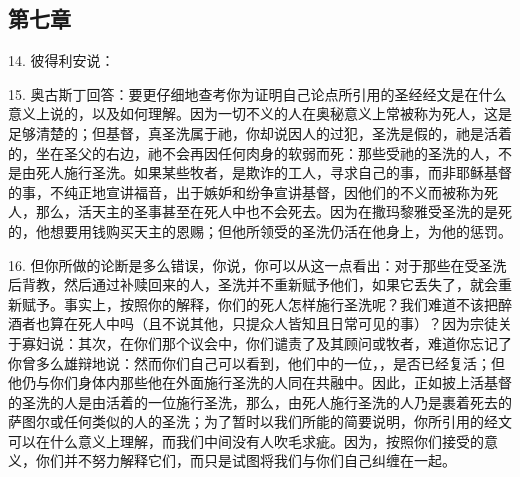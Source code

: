 
\subsection{第七章}

14. 彼得利安说：\par

15. 奥古斯丁回答：要更仔细地查考你为证明自己论点所引用的圣经经文是在什么意义上说的，以及如何理解。因为一切不义的人在奥秘意义上常被称为死人，这是足够清楚的；但基督，真圣洗属于祂，你却说因人的过犯，圣洗是假的，祂是活着的，坐在圣父的右边，祂不会再因任何肉身的软弱而死：那些受祂的圣洗的人，不是由死人施行圣洗。如果某些牧者，是欺诈的工人，寻求自己的事，而非耶稣基督的事，不纯正地宣讲福音，出于嫉妒和纷争宣讲基督，因他们的不义而被称为死人，那么，活天主的圣事甚至在死人中也不会死去。因为在撒玛黎雅受圣洗的是死的，他想要用钱购买天主的恩赐；但他所领受的圣洗仍活在他身上，为他的惩罚。\par

16. 但你所做的论断是多么错误，你说，你可以从这一点看出：对于那些在受圣洗后背教，然后通过补赎回来的人，圣洗并不重新赋予他们，如果它丢失了，就会重新赋予。事实上，按照你的解释，你们的死人怎样施行圣洗呢？我们难道不该把醉酒者也算在死人中吗（且不说其他，只提众人皆知且日常可见的事）？因为宗徒关于寡妇说：其次，在你们那个议会中，你们谴责了及其顾问或牧者，难道你忘记了你曾多么雄辩地说：然而你们自己可以看到，他们中的一位，，是否已经复活；但他仍与你们身体内那些他在外面施行圣洗的人同在共融中。因此，正如披上活基督的圣洗的人是由活着的一位施行圣洗，那么，由死人施行圣洗的人乃是裹着死去的萨图尔或任何类似的人的圣洗；为了暂时以我们所能的简要说明，你所引用的经文可以在什么意义上理解，而我们中间没有人吹毛求疵。因为，按照你们接受的意义，你们并不努力解释它们，而只是试图将我们与你们自己纠缠在一起。\par

